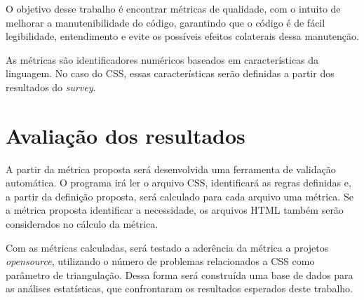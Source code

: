O objetivo desse trabalho é encontrar métricas de qualidade, com o intuito de melhorar a manutenibilidade do código, garantindo que o código é de fácil legibilidade, entendimento e evite os possíveis efeitos colaterais dessa manutenção.

As métricas são identificadores numéricos baseados em características da linguagem. No caso do CSS, essas características serão definidas a partir dos resultados do \textit{survey}.

\section{Avaliação dos resultados}

A partir da métrica proposta será desenvolvida uma ferramenta de validação automática. O programa irá ler o arquivo CSS, identificará as regras definidas e, a partir da definição proposta, será calculado para cada arquivo uma métrica. Se a métrica proposta identificar a necessidade, os arquivos HTML também serão considerados no cálculo da métrica.

Com as métricas calculadas, será testado a aderência da métrica a projetos \textit{opensource}, utilizando o número de problemas relacionados a CSS como parâmetro de triangulação. Dessa forma será construída uma base de dados para as análises estatísticas, que confrontaram os resultados esperados deste trabalho.

